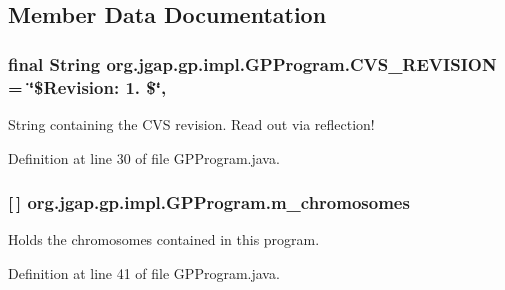 \subsection{Member Data Documentation}
\hypertarget{classorg_1_1jgap_1_1gp_1_1impl_1_1_g_p_program_ad52d02bd69b0ff3bb09316b000b1b92e}{
\subsubsection[{C\-V\-S\-\_\-\-R\-E\-V\-I\-S\-I\-O\-N}]{\setlength{\rightskip}{0pt plus 5cm}final String org.\-jgap.\-gp.\-impl.\-G\-P\-Program.\-C\-V\-S\-\_\-\-R\-E\-V\-I\-S\-I\-O\-N = \char`\"{}\$Revision\-: 1. \$\char`\"{}\hspace{0.3cm}{\ttfamily [static]}, {\ttfamily [private]}}}\label{classorg_1_1jgap_1_1gp_1_1impl_1_1_g_p_program_ad52d02bd69b0ff3bb09316b000b1b92e}
String containing the C\-V\-S revision. Read out via reflection! 

Definition at line 30 of file G\-P\-Program.\-java.

\hypertarget{classorg_1_1jgap_1_1gp_1_1impl_1_1_g_p_program_a0781913272a939c3c511d4139d233084}{
\subsubsection[{m\-\_\-chromosomes}]{ \mbox{[}$\,$\mbox{]} org.\-jgap.\-gp.\-impl.\-G\-P\-Program.\-m\-\_\-chromosomes\hspace{0.3cm}{\ttfamily [private]}}}\label{classorg_1_1jgap_1_1gp_1_1impl_1_1_g_p_program_a0781913272a939c3c511d4139d233084}
Holds the chromosomes contained in this program. 

Definition at line 41 of file G\-P\-Program.\-java.



